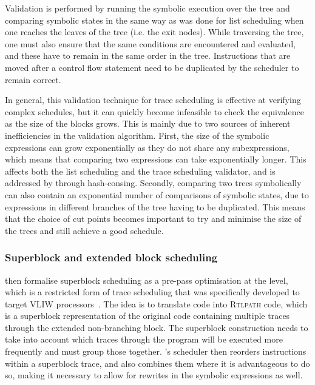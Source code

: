 Validation is performed by running the symbolic execution over the tree and
comparing symbolic states in the same way as was done for list scheduling when
one reaches the leaves of the tree (i.e. the exit nodes).  While traversing the
tree, one must also ensure that the same conditions are encountered and
evaluated, and these have to remain in the same order in the tree.  Instructions
that are moved after a control flow statement need to be duplicated by the
scheduler to remain correct.

In general, this validation technique for trace scheduling is effective at
verifying complex schedules, but it can quickly become infeasible to check the
equivalence as the size of the blocks grows.  This is mainly due to two sources
of inherent inefficiencies in the validation algorithm.  First, the size of the
symbolic expressions can grow exponentially as they do not share any
subexpressions, which means that comparing two expressions can take
exponentially longer.  This affects both the list scheduling and the trace
scheduling validator, and is addressed by
\citeauthor*{six20_certif_effic_instr_sched} through hash-consing.  Secondly,
comparing two trees symbolically can also contain an exponential number of
comparisons of symbolic states, due to expressions in different branches of the
tree having to be duplicated.  This means that the choice of cut points becomes
important to try and minimise the size of the trees and still achieve a good
schedule.

\subsubsection{Superblock and extended block scheduling}

\textcite{six22_formal_verif_super_sched} then formalise superblock scheduling
as a pre-pass optimisation at the \rtl{} level, which is a restricted form of
trace scheduling that was specifically developed to target VLIW
processors~\cite[]{hwu93_super}.  The idea is to translate \rtl{} code into
\textsc{Rtlpath} code, which is a superblock representation of the original code
containing multiple traces through the extended non-branching block.  The
superblock construction needs to take into account which traces through the
program will be executed more frequently and must group those together.
\citeauthor{six22_formal_verif_super_sched}'s scheduler then reorders
instructions within a superblock trace, and also combines them where it is
advantageous to do so, making it necessary to allow for rewrites in the symbolic
expressions as well.

